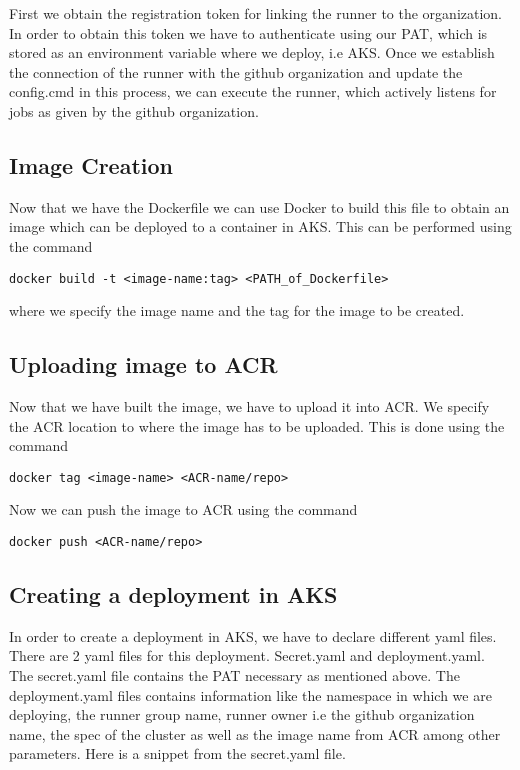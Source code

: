 First we obtain the registration token for linking the runner to the organization. In order to obtain this token we have to authenticate using our PAT, which is stored as an environment variable where we deploy, i.e AKS. Once we establish the connection of the runner with the github organization and update the config.cmd in this process, we can execute the runner, which actively listens for jobs as given by the github organization.

\subsection{Image Creation}
Now that we have the Dockerfile we can use Docker to build this file to obtain an image which can be deployed to a container in AKS. This can be performed using the command 
\begin{lstlisting}[breaklines]
docker build -t <image-name:tag> <PATH_of_Dockerfile>
\end{lstlisting}
where we specify the image name and the tag for the image to be created.

\subsection{Uploading image to ACR}
Now that we have built the image, we have to upload it into ACR. We specify the ACR location to where the image has to be uploaded. This is done using the command 

\begin{lstlisting}[breaklines]
docker tag <image-name> <ACR-name/repo>
\end{lstlisting}

Now we can push the image to ACR using the command

\begin{lstlisting}[breaklines]
docker push <ACR-name/repo>
\end{lstlisting}

\subsection{Creating a deployment in AKS} 
In order to create a deployment in AKS, we have to declare different yaml files. There are 2 yaml files for this deployment. Secret.yaml and deployment.yaml. The secret.yaml file contains the PAT necessary as mentioned above. The deployment.yaml files contains information like the namespace in which we are deploying, the runner group name, runner owner i.e the github organization name, the spec of the cluster as well as the image name from ACR among other parameters.
Here is a snippet from the secret.yaml file.

